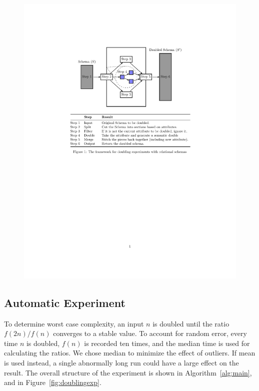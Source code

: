 \begin{figure}
\centering
  \centering
  \includegraphics[width=1\linewidth]{../diagrams/SemanticConstraintPGF.pdf}
  \label{fig:SemanticConstraintPGF}
\end{figure}


  \subsection{Automatic Experiment}
  \label{subsec:experiment}

To determine worst case complexity, an input $n$ is doubled until the 
ratio $f(2n) / f(n)$ converges to a stable value. To account for random
error, every time $n$ is doubled, $f(n)$ is recorded ten times, and the
median time is used for calculating the ratios.  We chose
median to minimize the effect of outliers. If mean is used instead, a
single abnormally long run could have a large effect on the result. The overall 
structure of the experiment is shown in Algorithm~\ref{alg:main}, and in
Figure~\ref{fig:doublingexp}.

